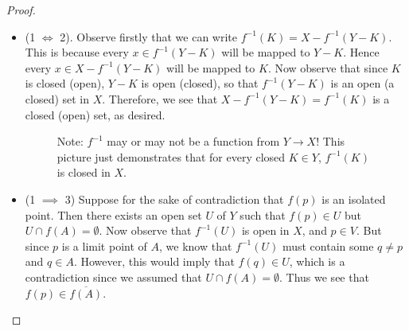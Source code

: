 \documentclass[letter,12pt,twoside]{hmcpset}
\begin{document}
\begin{proof}
    \begin{itemize}
        \item (1 $\iff$ 2). Observe firstly that we can write $f^{-1}(K) = X - f^{-1}(Y - K)$.
        This is because every $x \in f^{-1}(Y - K)$ will be mapped to $Y - K$. 
        Hence every $x \in X - f^{-1}(Y - K)$ will be mapped to $K$. Now observe
        that since $K$ is closed (open), $Y - K$ is open (closed), 
        so that $f^{-1}(Y - K)$ 
        is an open (a closed) set in $X$. Therefore, we see that 
        $X - f^{-1}(Y - K) = f^{-1}(K)$ is a closed (open) set, as desired.

        \begin{figure}[h!]
            \centering
            \caption{Note: $f^{-1}$ may or may not be a function from $Y
            \to X$! This picture just demonstrates that for every closed
            $K \in Y$, $f^{-1}(K)$ is closed in $X$.
    }
        \end{figure}

        \item (1 $\implies$ 3) Suppose for the sake of contradiction that 
        $f(p)$ is an isolated point. Then there exists an open set $U$ of 
        $Y$ such that $f(p) \in U$ but $U \cap f(A) = \emptyset$. Now observe 
        that $f^{-1}(U)$ is open in $X$, and $p \in V$. But since $p$ 
        is a limit point of $A$, we know that $f^{-1}(U)$ must contain 
        some $q \ne p$
        and $q \in A$. However, this would imply that $f(q) \in U$, 
        which is a contradiction since we assumed that $U \cap f(A) =
        \emptyset$.
        Thus we see that $f(p) \in \overline{f(A)}$.


\end{itemize}
\end{proof}
\end{document}
